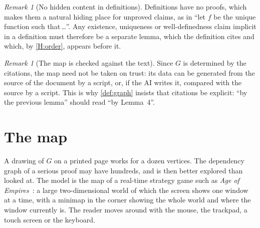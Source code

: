 \documentclass[11pt]{article}
\theoremstyle{plain}
\theoremstyle{definition}
\theoremstyle{remark}
\newtheorem{remark}[theorem]{Remark}
\theoremstyle{definition}
\theoremstyle{plain}
\theoremstyle{remark}
\begin{document}
\begin{remark}[No hidden content in definitions]\label{rem:hidden}
Definitions have no proofs, which makes them a natural hiding place for unproved claims, as in ``let $f$ be the unique function such that\,\dots''. Any existence, uniqueness or well-definedness claim implicit in a definition must therefore be a separate lemma, which the definition cites and which, by \ref{H:order}, appears before it.
\end{remark}

\begin{remark}[The map is checked against the text]\label{rem:computed}
Since $G$ is determined by the citations, the map need not be taken on trust: its data can be generated from the source of the document by a script, or, if the AI writes it, compared with the source by a script. This is why \cref{def:graph} insists that citations be explicit: ``by the previous lemma'' should read ``by Lemma~4''.
\end{remark}

\section{The map}\label{sec:map}

A drawing of $G$ on a printed page works for a dozen vertices. The dependency graph of a serious proof may have hundreds, and is then better explored than looked at. The model is the map of a real-time strategy game such as \emph{Age of Empires}~\cite{AoE}: a large two-dimensional world of which the screen shows one window at a time, with a minimap in the corner showing the whole world and where the window currently is. The reader moves around with the mouse, the trackpad, a touch screen or the keyboard.
\end{document}
